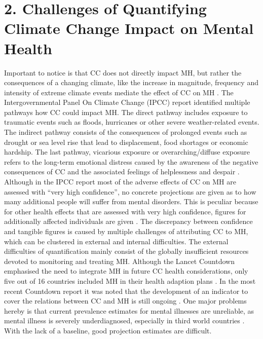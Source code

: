 \documentclass[
]{krantz}
\begin{document}
\section{2. Challenges of Quantifying Climate Change Impact on Mental Health}\label{challenges-of-quantifying-climate-change-impact-on-mental-health}

Important to notice is that CC does not directly impact MH, but rather the consequences of a changing climate, like the increase in magnitude, frequency and intensity of extreme climate events mediate the effect of CC on MH \citep{hayesClimateChangeMental2018}. The Intergovernmental Panel On Climate Change (IPCC) report identified multiple pathways how CC could impact MH. The direct pathway includes exposure to traumatic events such as floods, hurricanes or other severe weather-related events. The indirect pathway consists of the consequences of prolonged events such as drought or sea level rise that lead to displacement, food shortages or economic hardship. The last pathway, vicarious exposure or overarching/diffuse exposure refers to the long-term emotional distress caused by the awareness of the negative consequences of CC and the associated feelings of helplessness and despair \citep{intergovernmentalpanelonclimatechangeClimateChange20222023}.
Although in the IPCC report most of the adverse effects of CC on MH are assessed with ``very high confidence'', no concrete projections are given as to how many additional people will suffer from mental disorders. This is peculiar because for other health effects that are assessed with very high confidence, figures for additionally affected individuals are given \citep{intergovernmentalpanelonclimatechangeClimateChange20222023}.
The discrepancy between confidence and tangible figures is caused by multiple challenges of attributing CC to MH, which can be clustered in external and internal difficulties. The external difficulties of quantification mainly consist of the globally insufficient resources devoted to monitoring and treating MH. Although the Lancet Countdown emphasised the need to integrate MH in future CC health considerations, only five out of 16 countries included MH in their health adaption plans \citep{watts2018ReportLancet2018}. In the most recent Countdown report it was noted that the development of an indicator to cover the relations between CC and MH is still ongoing \citep{romanello2023ReportLancet2023a}. One major problems hereby is that current prevalence estimates for mental illnesses are unreliable, as mental illness is severely underdiagnosed, especially in third world countries \citep{worldhealthorganizationComprehensiveMentalHealth2021}. With the lack of a baseline, good projection estimates are difficult.
\end{document}
